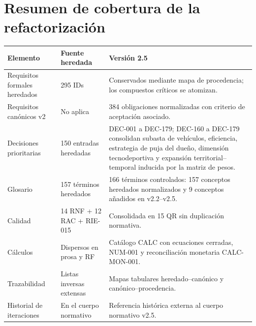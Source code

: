 \documentclass[10pt,letterpaper]{article}
\begin{document}
\section{Resumen de cobertura de la refactorización}
\begin{longtable}{P{7.2cm}P{3.0cm}P{3.0cm}}
\toprule
\textbf{Elemento} & \textbf{Fuente heredada} & \textbf{Versión 2.5}\\
\midrule
Requisitos formales heredados & 295 IDs & Conservados mediante mapa de procedencia; los compuestos críticos se atomizan.\\
Requisitos canónicos v2 & No aplica & 384 obligaciones normalizadas con criterio de aceptación asociado.\\
Decisiones prioritarias & 150 entradas heredadas & DEC-001 a DEC-179; DEC-160 a DEC-179 consolidan subasta de vehículos, eficiencia, estrategia de puja del dueño, dimensión tecnodeportiva y expansión territorial--temporal inducida por la matriz de pesos.\\
Glosario & 157 términos heredados & 166 términos controlados: 157 conceptos heredados normalizados y 9 conceptos añadidos en v2.2--v2.5.\\
Calidad & 14 RNF + 12 RAC + RIE-015 & Consolidada en 15 QR sin duplicación normativa.\\
Cálculos & Dispersos en prosa y RF & Catálogo CALC con ecuaciones cerradas, NUM-001 y reconciliación monetaria CALC-MON-001.\\
Trazabilidad & Listas inversas extensas & Mapas tabulares heredado--canónico y canónico--procedencia.\\
Historial de iteraciones & En el cuerpo normativo & Referencia histórica externa al cuerpo normativo v2.5.\\
\bottomrule
\end{longtable}
\end{document}
